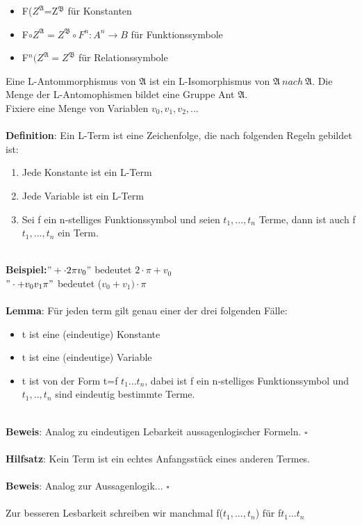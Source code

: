 \documentclass[a4paper]{scrartcl}
\begin{document}
\begin{itemize}
\item F($Z^\mathfrak{A}$=Z$^\mathfrak{B}$ für Konstanten
\item F$\circ Z^\mathfrak{A}=Z^\mathfrak{B}\circ F^n:A^n\rightarrow B$ für Funktionssymbole
\item F$^n(Z^\mathfrak{A}=Z^\mathfrak{B}$ für Relationssymbole
\end{itemize}
Eine L-Antommorphismus von $\mathfrak{A}$ ist ein L-Isomorphismus von $\mathfrak{A}~nach~\mathfrak{A}$. Die Menge der L-Antomophismen bildet eine Gruppe Ant $\mathfrak{A}$.\\
Fixiere eine Menge von Variablen $v_0,v_1,v_2,...$\\ \\
\textbf{Definition}: Ein L-Term ist eine Zeichenfolge, die nach folgenden Regeln gebildet ist:\\
\begin{enumerate}
\item Jede Konstante ist ein L-Term
\item Jede Variable ist ein L-Term
\item Sei f ein n-stelliges Funktionssymbol und seien $t_1,...,t_n$ Terme, dann ist auch f$t_1,...,t_n$ ein Term. \\ \\
\end{enumerate}
\textbf{Beispiel:}$"+\cdot 2 \pi v_0"$ bedeutet $2\cdot \pi + v_0$\\
$"\cdot + v_0 v_1 \pi"$ bedeutet ($v_0+v_1)\cdot \pi$ \\ \\
\textbf{Lemma}: Für jeden term gilt genau einer der drei folgenden Fälle:
\begin{itemize}
\item t ist eine (eindeutige) Konstante 
\item t ist eine (eindeutige) Variable
\item t ist von der Form t=f $t_1...t_n$, dabei ist f ein n-stelliges Funktionssymbol und $t_1,..,t_n$ sind eindeutig bestimmte 
Terme. \\ \\
\end{itemize}
\textbf{Beweis}: Analog zu eindeutigen Lebarkeit aussagenlogischer Formeln. $\square$\\ \\
\textbf{Hilfsatz}: Kein Term ist ein echtes Anfangsstück eines anderen Termes.\\ \\
\textbf{Beweis}: Analog zur Aussagenlogik... $\square$\\  \\
Zur besseren Lesbarkeit schreiben wir manchmal f($t_1,...,t_n$) für f$t_1...t_n$\\
\end{document}
